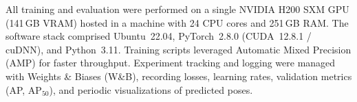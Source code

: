 All training and evaluation were performed on a single NVIDIA H200 SXM GPU (141\,GB VRAM) hosted in a machine with 24 CPU cores and 251\,GB RAM.  The software stack comprised Ubuntu~22.04, PyTorch~2.8.0 (CUDA~12.8.1 / cuDNN), and Python~3.11.  Training scripts leveraged Automatic Mixed Precision (AMP) for faster throughput.  Experiment tracking and logging were managed with Weights \& Biases (W\&B), recording losses, learning rates, validation metrics (AP, AP$_{50}$), and periodic visualizations of predicted poses.  